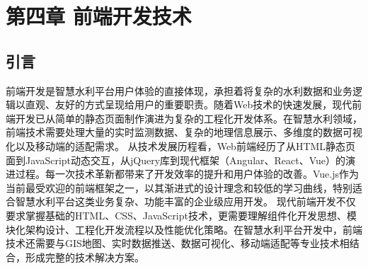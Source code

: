 \section{第四章 前端开发技术}\label{ux7b2cux56dbux7ae0-ux524dux7aefux5f00ux53d1ux6280ux672f} \learningobjectives{
}\subsection{引言}\label{ux5f15ux8a00}
前端开发是智慧水利平台用户体验的直接体现，承担着将复杂的水利数据和业务逻辑以直观、友好的方式呈现给用户的重要职责。随着Web技术的快速发展，现代前端开发已从简单的静态页面制作演进为复杂的工程化开发体系。在智慧水利领域，前端技术需要处理大量的实时监测数据、复杂的地理信息展示、多维度的数据可视化以及移动端的适配需求。
从技术发展历程看，Web前端经历了从HTML静态页面到JavaScript动态交互，从jQuery库到现代框架（Angular、React、Vue）的演进过程。每一次技术革新都带来了开发效率的提升和用户体验的改善。Vue.js作为当前最受欢迎的前端框架之一，以其渐进式的设计理念和较低的学习曲线，特别适合智慧水利平台这类业务复杂、功能丰富的企业级应用开发。
现代前端开发不仅要求掌握基础的HTML、CSS、JavaScript技术，更需要理解组件化开发思想、模块化架构设计、工程化开发流程以及性能优化策略。在智慧水利平台开发中，前端技术还需要与GIS地图、实时数据推送、数据可视化、移动端适配等专业技术相结合，形成完整的技术解决方案。
